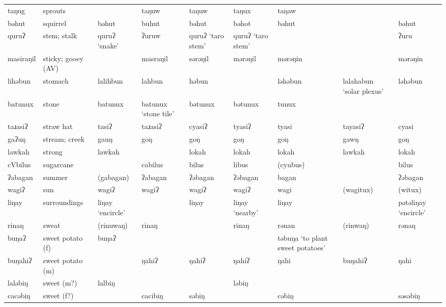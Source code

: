 \begin{landscape}
\begin{longtable}{*{9}{>{\raggedright\arraybackslash}p{}}}
\text{*}taŋug        & sprouts &  & taŋuw & taŋuw & taŋux & taŋaw &  & \\
\text{*}bəhut        & squirrel & bəhut & buhut & bəhut & bəhot & bəhut &  & bəhut\\
\text{*}quruʔ        & stem; stalk & quruʔ `snake' & ʔuruw & quruʔ \newline `taro stem' & quruʔ \newline `taro stem' &  &  & ʔuru\\
\text{*}masiraŋil    & sticky; gooey (AV) &  & masraŋil & sərəŋil & mərəŋil & mərəŋin &  & mərəŋin\\
\text{*}lihəbun      & stomach & lalihbun & lahbun & həbun &  & ləhəbun & lalahabun \newline `solar plexus' & ləhəbun\\
\text{*}batunux      & stone & batunux & batunux `stone tile' & bətunux & bətunux & tunux &  & \\
\text{*}taɹasiʔ      & straw hat & tasiʔ & taɹasiʔ & cyasiʔ & tyasiʔ & tyasi & tayasiʔ & cyasi\\
\text{*}gaʔuŋ        & stream; creek & gauŋ & goŋ & goŋ & goŋ & goŋ & gawŋ & goŋ\\
\text{*}lawkah       & strong & lawkah &  & lokah & lokah & lokah & lawkah & lokah\\
\text{*}cVbilus      & sugarcane &  & cabilus & bilus & libus & (cyubus) &  & bilus\\
\text{*}ʔabagan      & summer & (gabagan) & ʔabagan & ʔəbagan & ʔəbagan & bagan &  & ʔəbagan\\
\text{*}wagiʔ        & sun & wagiʔ & wagiʔ & wagiʔ & wagiʔ & wagi & (wagitux) & (witux)\\
\text{*}liŋay        & surroundings & liŋay \newline `encircle' &  & liŋay & liŋay `nearby' & liŋay &  & pətəliŋay \newline `encircle'\\
\text{*}rinaŋ        & sweat & (rinuwaŋ) & rinaŋ &  & rinaŋ & rənan & (rinwaŋ) & rənaŋ\\
\text{*}buŋaʔ        & sweet potato (f) & buŋaʔ &  &  &  & təbuŋa \newline `to plant sweet potatoes' &  & \\
\text{*}buŋahiʔ      & sweet potato (m) &  & ŋahiʔ & ŋahiʔ & ŋahiʔ & ŋahi & buŋahiʔ & ŋahi\\
\text{*}laləbiŋ      & sweet (m?) & lalbiŋ &  &  & ləbiŋ &  &  & \\
\text{*}cacəbiŋ      & sweet (f?) &  & cacibiŋ & səbiŋ &  & cəbiŋ &  & səsəbiŋ\\

\end{longtable}
\end{landscape}
